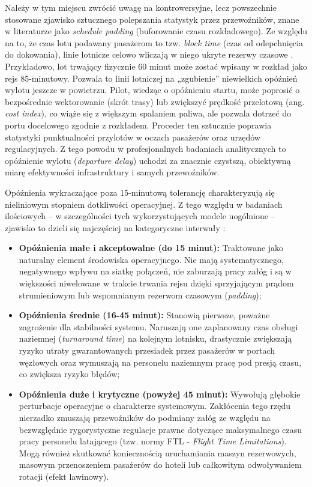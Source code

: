 Należy w tym miejscu zwrócić uwagę na kontrowersyjne, lecz powszechnie stosowane zjawisko sztucznego polepszania statystyk przez przewoźników, znane w literaturze jako \textit{schedule padding} (buforowanie czasu rozkładowego). Ze względu na to, że czas lotu podawany pasażerom to tzw. \textit{block time} (czas od odepchnięcia do dokowania), linie lotnicze celowo wliczają w niego ukryte rezerwy czasowe \cite{doganis}. Przykładowo, lot trwający fizycznie 60 minut może zostać wpisany w rozkład jako rejs 85-minutowy. Pozwala to linii lotniczej na „zgubienie” niewielkich opóźnień wylotu jeszcze w powietrzu. Pilot, wiedząc o opóźnieniu startu, może poprosić o bezpośrednie wektorowanie (skrót trasy) lub zwiększyć prędkość przelotową (ang. \textit{cost index}), co wiąże się z większym spalaniem paliwa, ale pozwala dotrzeć do portu docelowego zgodnie z rozkładem. Proceder ten sztucznie poprawia statystyki punktualności przylotów w oczach pasażerów oraz urzędów regulacyjnych. Z tego powodu w profesjonalnych badaniach analitycznych to opóźnienie wylotu (\textit{departure delay}) uchodzi za znacznie czystszą, obiektywną miarę efektywności infrastruktury i samych przewoźników.

Opóźnienia wykraczające poza 15-minutową tolerancję charakteryzują się nieliniowym stopniem dotkliwości operacyjnej. Z tego względu w badaniach ilościowych – w szczególności tych wykorzystujących modele uogólnione – zjawisko to dzieli się najczęściej na kategoryczne interwały \cite{greene2003}:
\begin{itemize}
    \item \textbf{Opóźnienia małe i akceptowalne (do 15 minut):} Traktowane jako naturalny element środowiska operacyjnego. Nie mają systematycznego, negatywnego wpływu na siatkę połączeń, nie zaburzają pracy załóg i są w większości niwelowane w trakcie trwania rejsu dzięki sprzyjającym prądom strumieniowym lub wspomnianym rezerwom czasowym (\textit{padding});
    \item \textbf{Opóźnienia średnie (16-45 minut):} Stanowią pierwsze, poważne zagrożenie dla stabilności systemu. Naruszają one zaplanowany czas obsługi naziemnej (\textit{turnaround time}) na kolejnym lotnisku, drastycznie zwiększają ryzyko utraty gwarantowanych przesiadek przez pasażerów w portach węzłowych oraz wymuszają na personelu naziemnym pracę pod presją czasu, co zwiększa ryzyko błędów;
    \item \textbf{Opóźnienia duże i krytyczne (powyżej 45 minut):} Wywołują głębokie perturbacje operacyjne o charakterze systemowym. Zakłócenia tego rzędu nierzadko zmuszają przewoźników do podmiany załóg ze względu na bezwzględnie rygorystyczne regulacje prawne dotyczące maksymalnego czasu pracy personelu latającego (tzw. normy FTL - \textit{Flight Time Limitations}). Mogą również skutkować koniecznością uruchamiania maszyn rezerwowych, masowym przenoszeniem pasażerów do hoteli lub całkowitym odwoływaniem rotacji (efekt lawinowy).
\end{itemize}


